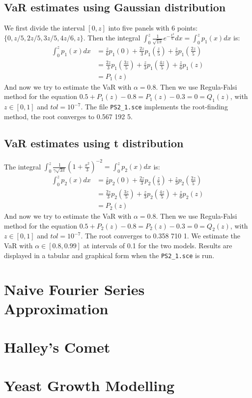 \documentclass[10pt, twocolumn]{article}
\begin{document}
		\subsection{VaR estimates using Gaussian distribution}
		We first divide the interval $[0, z]$ into five panels with 6 points: $\{0, z/5, 2z/5, 3z/5, 4z/6, z\}$.
		Then the integral $\int_{0}^{z}\frac{1}{\sqrt{1\pi}}e^{-\frac{x^2}{6}}dx = \int_{0}^{z}p_1(x)dx$ is:
		\begin{equation}
		\begin{aligned}
			\int_{0}^{z}p_1(x)dx &= \frac{z}{6}p_1(0) + \frac{2z}{3}p_1\left(\frac{z}{5}\right) + \frac{z}{3}p_1\left(\frac{2z}{5}\right)\\
				&= \frac{2z}{3}p_1\left(\frac{3z}{5}\right) + \frac{z}{3}p_1\left(\frac{4z}{5}\right) + \frac{z}{6}p_1(z)\\
				&= P_1(z)
		\end{aligned}
		\end{equation}
		And now we try to estimate the VaR with $\alpha=0.8$.
		Then we use Regula-Falsi method for the equation $0.5 + P_1(z) - 0.8 = P_1(z)-0.3=0=Q_1(z)$, with $z\in[0,1]$ and $tol=10^{-7}$.
		The file \texttt{PS2\_1.sce} implements the root-finding method, the root converges to 0.567 192 5.
		
		\subsection{VaR estimates using t distribution}
		The integral $\int_{0}^{z}\frac{1}{\gamma\sqrt{3\pi}}\left(1+\frac{x^2}{3}\right)^{-2} = \int_{0}^{z}p_2(x)dx$ is:
		\begin{equation}
		\begin{aligned}
			\int_{0}^{z}p_2(x)dx &= \frac{z}{6}p_2(0) + \frac{2z}{3}p_2\left(\frac{z}{5}\right) + \frac{z}{3}p_2\left(\frac{2z}{5}\right)\\
				&= \frac{2z}{3}p_2\left(\frac{3z}{5}\right) + \frac{z}{3}p_2\left(\frac{4z}{5}\right) + \frac{z}{6}p_2(z)\\
				&= P_2(z)
		\end{aligned}
		\end{equation}
		And now we try to estimate the VaR with $\alpha=0.8$.
		Then we use Regula-Falsi method for the equation $0.5 + P_2(z) - 0.8 = P_2(z)-0.3=0=Q_2(z)$, with $z\in[0,1]$ and $tol=10^{-7}$.
		The root converges to 0.358 710 1.
		We estimate the VaR with $\alpha\in[0.8, 0.99]$ at intervals of 0.1 for the two models.
		Results are displayed in a tabular and graphical form when the \texttt{PS2\_1.sce} is run.
		
	\section{Naive Fourier Series Approximation}
	\section{Halley's Comet}
	\section{Yeast Growth Modelling}
\end{document}
